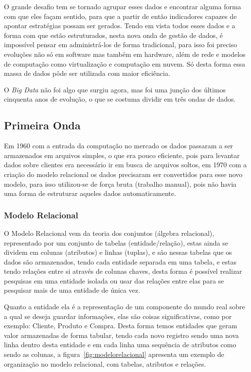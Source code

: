 O grande desafio tem se tornado agrupar esses dados e encontrar alguma forma com que eles façam sentido, para que a partir de então indicadores capazes de apontar estratégias possam ser gerados. Tendo em vista todos esses dados e a forma com que estão estruturados, nesta nova onda de gestão de dados, é impossível pensar em administrá-los de forma tradicional, para isso foi preciso evoluções não só em software mas também em hardware, além de rede e modelos de computação como virtualização e computação em nuvem. Só desta forma essa massa de dados pôde ser utilizada com maior eficiência.~\cite{leigos}

O \textit{Big Data} não foi algo que surgiu agora, mas foi uma junção dos últimos cinquenta anos de evolução, o que se costuma dividir em três ondas de dados.

\subsection{Primeira Onda}
\label{subsec:primeiraonda}
Em 1960 com a entrada da computação no mercado os dados passaram a ser armazenados em arquivos simples, o que era pouco eficiente, pois para levantar dados sobre clientes era necessário ir em busca de arquivos soltos, em 1970 com a criação do modelo relacional os dados precisaram ser convertidos para esse novo modelo, para isso utilizou-se de força bruta (trabalho manual), pois não havia uma forma de estruturar aqueles dados automaticamente.%

\subsubsection{Modelo Relacional}
\label{subsubsec:modelorelacional}
O Modelo Relacional vem da teoria dos conjuntos (álgebra relacional), representado por um conjunto de tabelas (entidade/relação), estas ainda se dividem em colunas (atributos) e linhas (tuplas), e são nessas tabelas que os dados são armazenados, tendo cada entidade separada em uma tabela, e estas tendo relações entre si através de colunas chaves, desta forma é possível realizar pesquisas em uma entidade isolada ou usar das relações entre elas para se pesquisar mais de uma entidade de única vez.

Quanto a entidade ela é a representação de um componente do mundo real sobre a qual se deseja guardar informações, elas são coisas significativas, como por exemplo: Cliente, Produto e Compra. Desta forma temos entidades que geram valor armazenadas de forma tabular, tendo cada novo registro sendo uma nova linha dentro desta entidade e em cada linha uma sequência de atributos como sendo as colunas, a figura~\ref{fig:modelorelacional} apresenta um exemplo de organização no modelo relacional, com tabelas, atributos e relações.~\cite{relacional}

